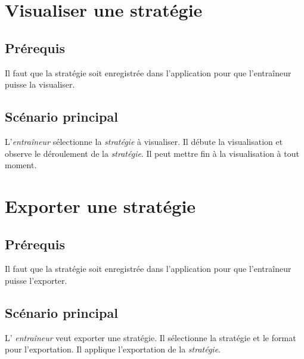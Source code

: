 \section{Visualiser une stratégie}
\label{sec:visualiser_une_strategie}

\subsection{Pr\'erequis}
\label{sub:prerequis}
Il faut que la strat\'egie soit enregistr\'ee dans l'application pour que l'entraîneur puisse la visualiser.

\subsection{Sc\'enario principal}
\label{sub:sc'enario_principal}

L'\textit{entra\^ineur} s\'electionne la \textit{strat\'egie} \`a visualiser.
Il d\'ebute la visualisation et observe le d\'eroulement de la \textit{strat\'egie}.
Il peut mettre fin \`a la visualisation \`a tout moment.

\section{Exporter une stratégie}
\label{sec:exporter_une_strategie}

\subsection{Pr\'erequis}
\label{sub:prerequis}
Il faut que la strat\'egie soit enregistr\'ee dans l'application pour que l'entraîneur puisse l'exporter.

\subsection{Sc\'enario principal}
\label{sub:sc'enario_principal}

L' \textit{entra\^ineur} veut exporter une strat\'egie.
Il s\'electionne la strat\'egie et le format pour l'exportation.
Il applique l'exportation de la \textit{strat\'egie}.
